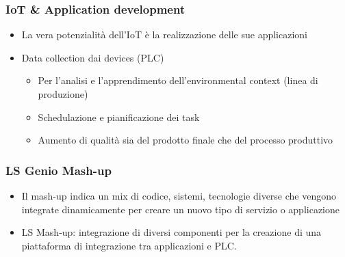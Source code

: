 \documentclass{beamer}
\begin{document}
\begin{frame}
\frametitle{IoT \& Application development}
	\begin{itemize}
		\item La vera potenzialità dell'IoT è la realizzazione delle sue applicazioni
		\item Data collection dai devices (PLC)
		\begin{itemize}
			\item Per l'analisi e l'apprendimento dell'environmental context (linea di produzione)
			\item Schedulazione e pianificazione dei task
			\item Aumento di qualità sia del prodotto finale che del processo produttivo
		\end{itemize}
	\end{itemize}
\end{frame}

\begin{frame}
	\frametitle{LS Genio Mash-up}
	\begin{itemize}
		\item Il mash-up indica un mix di codice, sistemi, tecnologie diverse che vengono integrate dinamicamente per creare un nuovo tipo di servizio o applicazione
		\item LS Mash-up: integrazione di diversi componenti per la creazione di una piattaforma di integrazione tra applicazioni e PLC.
	\end{itemize}
\end{frame}
\end{document}
